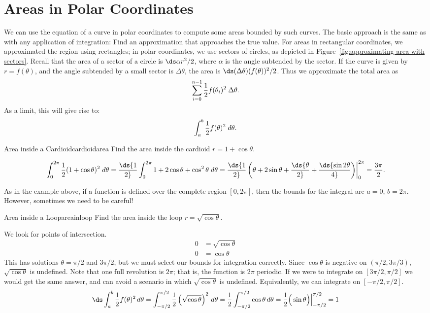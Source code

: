\section{Areas in Polar Coordinates}\label{sec:Areas in polar coordinates}
We can use the equation of a curve in polar coordinates to compute
some areas bounded by such curves.
The basic approach is the same as with any application of integration:
Find an approximation that approaches the true value. For areas in
rectangular coordinates, we approximated the region using rectangles;
in polar coordinates, we use sectors of circles, as depicted in
Figure~\ref{fig:approximating area with sectors}. Recall that the
area of a sector of a circle is $\ds \alpha r^2/2$, where $\alpha$ is the
angle subtended by the sector. If the curve is given by $r=f(\theta)$,
and the angle subtended by a small sector is $\Delta\theta$, 
the area is $\ds (\Delta\theta)(f(\theta))^2/2$.
Thus we approximate the total area as
$$\sum_{i=0}^{n-1} {1\over 2} f(\theta_i)^2\;\Delta\theta.$$
As a limit, this will give rise to:
$$\int_a^b {1\over 2} f(\theta)^2\;d\theta.$$

\begin{example}{Area inside a Cardioid}{cardioidarea}
Find the area inside the cardioid $r=1+\cos\theta$.
\end{example}

\begin{solution}
$$\int_0^{2\pi}{1\over 2} (1+\cos\theta)^2\;d\theta=
\ds{1\over 2}\int_0^{2\pi} 1+2\cos\theta+\cos^2\theta\;d\theta=
\ds{1\over 2}\left(\theta +2\sin\theta+
\ds{\theta\over2}+\ds{\sin2\theta\over4}\middle)\right|_0^{2\pi}={3\pi\over2}.$$
\end{solution}

As in the example above, if a function is defined over the complete region $[0,2\pi]$, then the bounds for the integral are $a=0$, $b=2\pi$. However, sometimes we need to be careful!

\begin{example}{Area inside a Loop}{areainloop}
Find the area inside the loop $r=\sqrt{\cos\theta}$.
\end{example}
\begin{solution}
We look for points of intersection.
\begin{align*}
0&=\sqrt{\cos\theta}	\\
0&=\cos\theta
\end{align*}
This has solutions $\theta=\pi/2$ and $3\pi/2$, but we must select our bounds for integration correctly. Since $\cos\theta$ is negative on $(\pi/2,3\pi/3)$, $\sqrt{\cos\theta}$ is undefined. Note that one full revolution is $2\pi$; that is, the function is $2\pi$ periodic. If we were to integrate on $[3\pi/2,\pi/2]$ we would get the same answer, and can avoid a scenario in which $\sqrt{\cos\theta}$ is undefined. Equivalently, we can integrate on $[-\pi/2,\pi/2]$.
\[\ds \int_a^b\frac{1}{2} f(\theta)^2\,d\theta=\int_{-\pi/2}^{\pi/2}\frac{1}{2}\left(\sqrt{\cos\theta}\right)^2\,d\theta=\frac{1}{2}\int_{-\pi/2}^{\pi/2}\cos\theta\,d\theta=\frac{1}{2}\Big(\sin\theta\Big)\Big|_{-\pi/2}^{\pi/2}=1\]
\end{solution}

